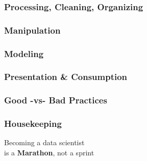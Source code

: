 \documentclass[12pt]{beamer}\usepackage[]{graphicx}\usepackage[]{color}
\begin{document}

\begin{frame}
\frametitle{Processing, Cleaning, Organizing}
\begin{center}
\end{center}
\end{frame}


\begin{frame}
\frametitle{Manipulation}
\begin{center}
\end{center}
\end{frame}


\begin{frame}
\frametitle{Modeling}
\begin{center}
\end{center}
\end{frame}


\begin{frame}
\frametitle{Presentation \& Consumption}
\begin{center}
\end{center}
\end{frame}


\begin{frame}
\frametitle{Good -vs- Bad Practices}
\begin{center}
\end{center}
\end{frame}


\begin{frame}
\frametitle{Housekeeping}
\begin{center}
\end{center}
\end{frame}


\begin{frame}
  \begin{center}
    \Huge{Becoming a data scientist \\ is a {\hilit \textbf{Marathon}}, not a sprint}
  \end{center}
\end{frame}
\end{document}
